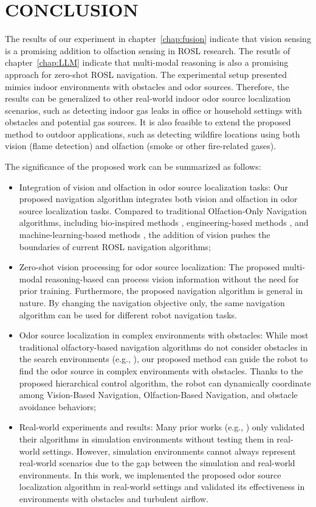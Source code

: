 \chapter{CONCLUSION}\label{chap:conclusion}

The results of our experiment in chapter~\ref{chap:fusion} indicate that vision sensing is a promising addition to olfaction sensing in ROSL research. The resutls of chapter~\ref{chap:LLM} indicate that multi-modal reasoning is also a promising approach for zero-shot ROSL navigation. The experimental setup presented mimics indoor environments with obstacles and odor sources. Therefore, the results can be generalized to other real-world indoor odor source localization scenarios, such as detecting indoor gas leaks in office or household settings with obstacles and potential gas sources. It is also feasible to extend the proposed method to outdoor applications, such as detecting wildfire locations using both vision (flame detection) and olfaction (smoke or other fire-related gases).

The significance of the proposed work can be summarized as follows:
\begin{itemize}
  \item {Integration of vision and olfaction in odor source localization tasks:} Our proposed navigation algorithm integrates both vision and olfaction in odor source localization tasks. Compared to traditional Olfaction-Only Navigation algorithms, including bio-inspired methods \cite{lopez2011moth}, engineering-based methods \cite{luong2023odor, zhu2020novel}, and machine-learning-based methods \cite{kim2019source, hu2019plume}, the addition of vision pushes the boundaries of current ROSL navigation algorithms;
  \item {Zero-shot vision processing for odor source localization:} The proposed multi-modal reasoning-based can process vision information without the need for prior training. Furthermore, the proposed navigation algorithm is general in nature. By changing the navigation objective only, the same navigation algorithm can be used for different robot navigation tasks.
  \item {Odor source localization in complex environments with obstacles:} While most traditional olfactory-based navigation algorithms do not consider obstacles in the search environments (e.g., \cite{lopez2011moth}), our proposed method can guide the robot to find the odor source in complex environments with obstacles. Thanks to the proposed hierarchical control algorithm, the robot can dynamically coordinate among Vision-Based Navigation, Olfaction-Based Navigation, and obstacle avoidance behaviors;
  \item {Real-world experiments and results:} Many prior works (e.g., \cite{hu2019plume}) only validated their algorithms in simulation environments without testing them in real-world settings. However, simulation environments cannot always represent real-world scenarios due to the gap between the simulation and real-world environments. In this work, we implemented the proposed odor source localization algorithm in real-world settings and validated its effectiveness in environments with obstacles and turbulent airflow.
\end{itemize}